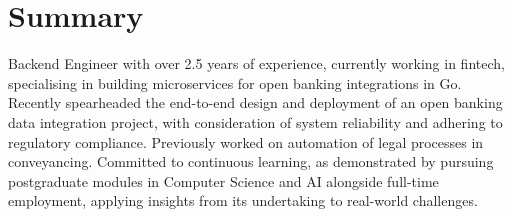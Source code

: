 \documentclass{article}
\begin{document}
\section{Summary}
Backend Engineer with over 2.5 years of experience, currently working in fintech, specialising in building microservices for open banking integrations in Go. Recently spearheaded the end-to-end design and deployment of an open banking data integration project, with consideration of system reliability and adhering to regulatory compliance. Previously worked on automation of legal processes in conveyancing. Committed to continuous learning, as demonstrated by pursuing postgraduate modules in Computer Science and AI alongside full-time employment, applying insights from its undertaking to real-world challenges.
\end{document}
